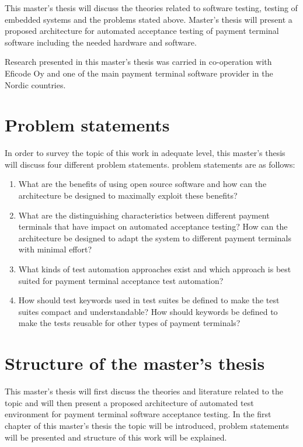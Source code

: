 This master's thesis will discuss the theories related to software testing, testing of embedded systems and the problems stated above. Master's thesis will present a proposed architecture for automated acceptance testing of payment terminal software including the needed hardware and software.

Research presented in this master's thesis was carried in co-operation with Eficode Oy and one of the main payment terminal software provider in the Nordic countries.

\section{Problem statements}

In order to survey the topic of this work in adequate level, this master's thesis will discuss four different problem statements. problem statements are as follows:
\begin{enumerate}
\item What are the benefits of using open source software and how can the architecture be designed to maximally exploit these benefits?
\item What are the distinguishing characteristics between different payment terminals that have impact on automated acceptance testing? How can the architecture be designed to adapt the system to different payment terminals with minimal effort?
\item What kinds of test automation approaches exist and which approach is best suited for payment terminal acceptance test automation?
\item How should test keywords used in test suites be defined to make
the test suites compact and understandable? How should keywords be defined to make the tests reusable for other types of payment terminals?
\end{enumerate}

\section{Structure of the master's thesis}
\label{section:structure} 

This master's thesis will first discuss the theories and literature related to the topic and will then present a proposed architecture of automated test environment for payment terminal software acceptance testing. In the first chapter of this master's thesis the topic will be introduced, problem statements will be presented and structure of this work will be explained.

